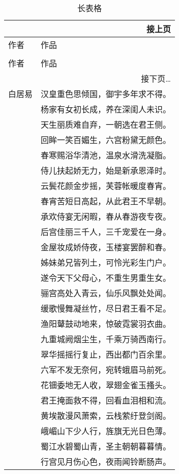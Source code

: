 \begin{longtable}{ll}
    \multicolumn{2}{r}{接上页} \\
    \toprule
    作者 & 作品 \\
    \midrule
    \endhead
\caption{长表格} \\
    \toprule
    作者 & 作品 \\
    \midrule
    \endfirsthead
    \bottomrule
    \multicolumn{2}{r}{接下页\dots} \\
    \endfoot
    \bottomrule
    \endlastfoot
    白居易 & 汉皇重色思倾国，御宇多年求不得。\\
    & 杨家有女初长成，养在深闺人未识。\\
    & 天生丽质难自弃，一朝选在君王侧。\\
    & 回眸一笑百媚生，六宫粉黛无颜色。\\
    & 春寒赐浴华清池，温泉水滑洗凝脂。\\
    & 侍儿扶起娇无力，始是新承恩泽时。\\
    & 云鬓花颜金步摇，芙蓉帐暖度春宵。\\
    & 春宵苦短日高起，从此君王不早朝。\\
    & 承欢侍宴无闲暇，春从春游夜专夜。\\
    & 后宫佳丽三千人，三千宠爱在一身。\\
    & 金屋妆成娇侍夜，玉楼宴罢醉和春。\\
    & 姊妹弟兄皆列土，可怜光彩生门户。\\
    & 遂令天下父母心，不重生男重生女。\\
    & 骊宫高处入青云，仙乐风飘处处闻。\\
    & 缓歌慢舞凝丝竹，尽日君王看不足。\\
    & 渔阳鼙鼓动地来，惊破霓裳羽衣曲。\\
    & 九重城阙烟尘生，千乘万骑西南行。\\
    & 翠华摇摇行复止，西出都门百余里。\\
    & 六军不发无奈何，宛转蛾眉马前死。\\
    & 花钿委地无人收，翠翅金雀玉搔头。\\
    & 君王掩面救不得，回看血泪相和流。\\
    & 黄埃散漫风萧索，云栈萦纡登剑阁。\\
    & 峨嵋山下少人行，旌旗无光日色薄。\\
    & 蜀江水碧蜀山青，圣主朝朝暮暮情。\\
    & 行宫见月伤心色，夜雨闻铃断肠声。\\
\end{longtable}
